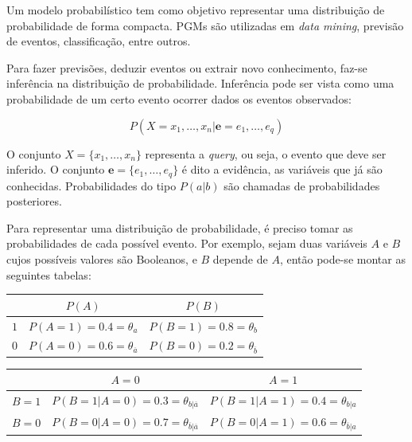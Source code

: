 \documentclass[a4paper,10pt]{article}
\theoremstyle{plain}
\begin{document}
Um modelo probabilístico tem como objetivo representar uma distribuição de probabilidade de forma
compacta. PGMs são utilizadas em \textit{data mining}, previsão de eventos, classificação, entre
outros.

Para fazer previsões, deduzir eventos ou extrair novo conhecimento, faz-se inferência na
distribuição de probabilidade. Inferência pode ser vista como uma probabilidade de um certo evento
ocorrer dados os eventos observados:

\begin{equation*}
  P(X=x_1,\ldots,x_n|\mathbf{e}=e_1,\ldots,e_q)
\end{equation*}

O conjunto $X=\{x_1,\ldots,x_n\}$ representa a \textit{query}, ou seja, o evento que deve ser
inferido. O conjunto $\mathbf{e}=\{e_1,\ldots,e_q\}$ é dito a evidência, as variáveis que já são
conhecidas. Probabilidades do tipo $P(a|b)$ são chamadas de probabilidades posteriores.

Para representar uma distribuição de probabilidade, é preciso tomar as probabilidades de cada
possível evento. Por exemplo, sejam duas variáveis $A$ e $B$ cujos possíveis valores são Booleanos,
e $B$ depende de $A$, então pode-se montar as seguintes tabelas:

\begin{table}[h]
  \begin{center}
    \begin{tabular}{l | c | c}
      & $P(A)$ & $P(B)$ \\
      \hline
      $1$ & $P(A=1)=0.4=\theta_a$ & $P(B=1)=0.8=\theta_b$ \\
      $0$ & $P(A=0)=0.6=\theta_{\overline{a}}$ & $P(B=0)=0.2=\theta_{\overline{b}}$ \\
    \end{tabular}
    \newline
    \vspace*{0.5cm}
    \newline
    \begin{tabular}{l | c | c}
      & $A=0$ & $A=1$ \\
      \hline
      $B=1$ & $P(B=1|A=0)=0.3=\theta_{b|\overline{a}}$ & $P(B=1|A=1)=0.4=\theta_{b|a}$ \\
      $B=0$ & $P(B=0|A=0)=0.7=\theta_{\overline{b}|\overline{a}}$ & $P(B=0|A=1)=0.6=\theta_{\overline{b}|a}$ \\
    \end{tabular}
  \end{center}
\end{table}
\end{document}
